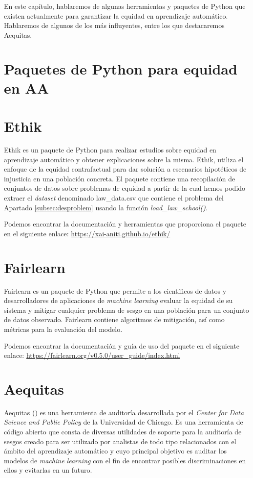 En este capítulo, hablaremos de algunas herramientas y paquetes de Python que existen actualmente para garantizar la equidad en aprendizaje automático. Hablaremos de algunos de los más influyentes, entre los que destacaremos Aequitas. 

\section{Paquetes de Python para equidad en AA}

\section*{Ethik}

Ethik es un paquete de Python para realizar estudios sobre equidad en aprendizaje automático y obtener explicaciones sobre la misma. Ethik, utiliza el enfoque de la equidad contrafactual para dar solución a escenarios hipotéticos de injusticia en una población concreta. El paquete contiene una recopilación de conjuntos de datos sobre problemas de equidad a partir de la cual hemos podido extraer el \textit{dataset} denominado law\_data.csv que contiene el problema del Apartado \ref{subsec:desproblem} usando la función \textit{load\_law\_school()}.

Podemos encontrar la documentación y herramientas que proporciona el paquete en el siguiente enlace: \url{https://xai-aniti.github.io/ethik/}

\section*{Fairlearn}

Fairlearn es un paquete de Python que permite a los científicos de datos y desarrolladores de aplicaciones de \textit{machine learning} evaluar la equidad de su sistema y mitigar cualquier problema de sesgo en una población para un conjunto de datos observado. Fairlearn contiene  algoritmos de mitigación, así como métricas para la evaluación del modelo.

Podemos encontrar la documentación y guía de uso del paquete en el siguiente enlace: \url{https://fairlearn.org/v0.5.0/user_guide/index.html}

\section{Aequitas}

Aequitas (\cite{aequitas2019}) es una herramienta de auditoría desarrollada por el \textit{Center for Data Science and Public Policy} de la
Universidad de Chicago. Es una herramienta de código abierto que consta de diversas utilidades de soporte para la auditoría de sesgos creado para ser utilizado por analistas de todo tipo relacionados con el ámbito del aprendizaje automático y cuyo principal objetivo es auditar los modelos de \textit{machine learning} con el fin de encontrar posibles discriminaciones en ellos y evitarlas en un futuro.

